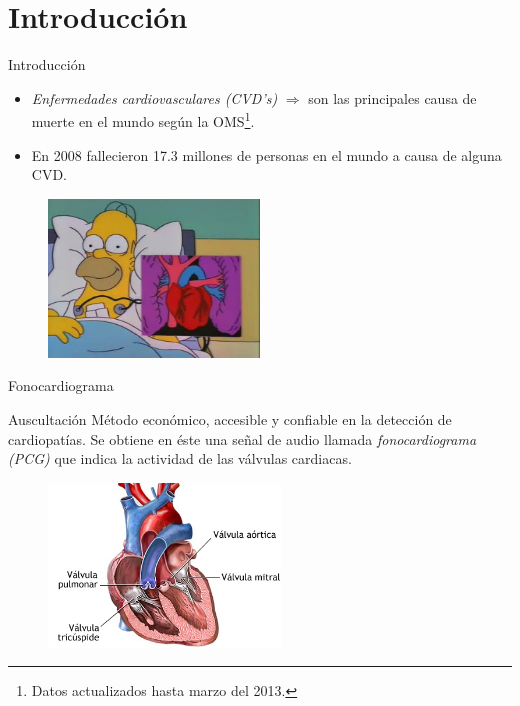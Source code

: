 \documentclass[xcolor=table]{beamer}
\begin{document}
\section{Introducci\'on}

\begin{frame}{Introducci\'on}
	\begin{itemize}
	\item<2-> \emph{Enfermedades cardiovasculares (CVD's)}  $\Rightarrow$ son las principales causa de muerte en el mundo seg\'un la OMS\footnote{Datos actualizados hasta marzo del 2013.}.
	
	\item<3-> En 2008 fallecieron 17.3 millones de personas en el mundo a causa de alguna CVD.
	\end{itemize}\pause
		\begin{figure}
		\centering
		\includegraphics[width=0.5\textwidth]{homers_heart.jpg}
	\end{figure}
\end{frame}

\begin{frame}{Fonocardiograma}
	\begin{exampleblock}{Auscultaci\'on}
		M\'etodo econ\'omico, accesible y confiable en la detecci\'on de cardiopat\'ias. Se obtiene en \'este una se\~nal de audio llamada \emph{fonocardiograma (PCG)} que indica la actividad de las v\'alvulas cardiacas.	
	\end{exampleblock}
			\begin{figure}
		\centering
		\includegraphics[width=0.55\textwidth]{valvulas_cardiacas.jpg}
	\end{figure}
\end{frame}
\end{document}
